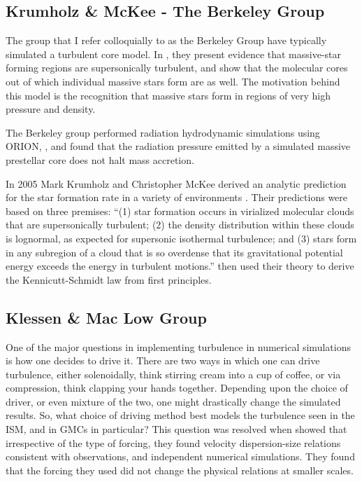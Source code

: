 \documentclass[../dissertation.tex]{subfiles}
\begin{document}
\subsection{Krumholz \& McKee - The Berkeley Group}

The group that I refer colloquially to as the Berkeley Group have typically simulated a turbulent core model.
In \citet{2003ApJ...585..850M}, they present evidence that massive-star forming regions are supersonically turbulent, 
and show that the molecular cores out of which individual massive stars form are as well.
The motivation behind this model is the recognition that massive stars form in regions of very high pressure and density.

The Berkeley group performed radiation hydrodynamic simulations using ORION,
\citep{2009Sci...323..754K}, and found that the radiation pressure emitted by a simulated massive prestellar core does not halt mass accretion. 

In 2005 Mark Krumholz and Christopher McKee derived an analytic prediction for the star formation rate in a variety of environments \citep{2005ApJ...630..250K}. 
Their predictions were based on three premises: 
``(1) star formation occurs in virialized molecular clouds that are supersonically turbulent; (2) the density distribution within these clouds is lognormal, as expected for supersonic isothermal turbulence; and (3) stars form in any subregion of a cloud that is so overdense that its gravitational potential energy exceeds the energy in turbulent motions.''\citep{2005ApJ...630..250K}
\citet{2005ApJ...630..250K} then used their theory to derive the Kennicutt-Schmidt law from first principles. 

\citet{2005ApJ...630..250K}






\subsection{Klessen \& Mac Low Group} 
One of the major questions in implementing turbulence in numerical simulations is how one decides to drive it. 
There are two ways in which one can drive turbulence, either solenoidally, think stirring cream into a cup of coffee, 
or via compression, think clapping your hands together. 
Depending upon the choice of driver, or even mixture of the two, one might drastically change the simulated results. 
So, what choice of driving method best models the turbulence seen in the ISM, and in GMCs in particular?
This question was resolved when \citet{2010A&A...512A..81F} showed that irrespective of the type of forcing, 
they found velocity dispersion-size relations consistent with observations, and independent numerical simulations. 
They found that the forcing they used did not change the physical relations at smaller scales. 
\end{document}

